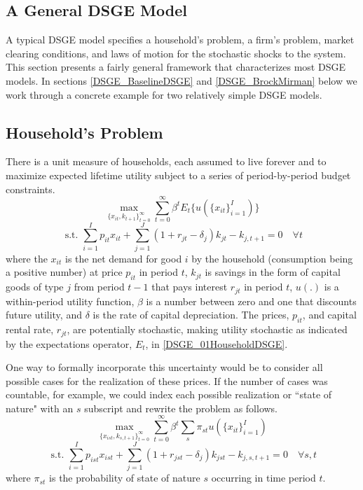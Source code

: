 \documentclass[letterpaper,12pt]{article}
\theoremstyle{definition}
\begin{document}
\begin{spacing}{1.5}
\section{A General DSGE Model}
	A typical DSGE model specifies a household's problem, a firm's problem, market clearing conditions, and laws of motion for the stochastic shocks to the system. This section presents a fairly general framework that characterizes most DSGE models. In sections \ref{DSGE_BaselineDSGE} and \ref{DSGE_BrockMirman} below we work through a concrete example for two relatively simple DSGE models.

	\subsection{Household's Problem}
		There is a unit measure of households, each assumed to live forever and to maximize expected lifetime utility subject to a series of period-by-period budget constraints.
		\begin{equation}\label{DSGE_01HouseholdDSGE}
		 \max_{\{x_{it},k_{t+1}\}_{t=0}^\infty} \sum_{t=0}^\infty \beta^t E_t\{u(\{x_{it}\}_{i=1}^I)\} \nonumber
		\end{equation}
		\begin{equation}
		\text{ s.t. } \sum_{i=1}^I p_{it}x_{it} + \sum_{j=1}^J(1+r_{jt}-\delta_{j})k_{jt} - k_{j,t+1} = 0\quad \forall t
		\end{equation}
		where the $x_{it}$ is the net demand for good $i$ by the household (consumption being a positive number) at price $p_{it}$ in period $t$, $k_{jt}$ is savings in the form of capital goods of type $j$ from period $t-1$ that pays interest $r_{jt}$ in period $t$, $u(.)$ is a within-period utility function, $\beta$ is a number between zero and one that discounts future utility, and $\delta$ is the rate of capital depreciation. The prices, $p_{it}$, and capital rental rate, $r_{jt}$, are potentially stochastic, making utility stochastic as indicated by the expectations operator, $E_t$, in \eqref{DSGE_01HouseholdDSGE}.

		One way to formally incorporate this uncertainty would be to consider all possible cases for the realization of these prices. If the number of cases was countable, for example, we could index each possible realization or ``state of nature" with an $s$ subscript and rewrite the problem as follows.
		\begin{equation}\label{DSGE_02HouseholdDSGE}
		 \max_{\{x_{ist},k_{s,t+1}\}_{t=0}^\infty} \sum_{t=0}^\infty \beta^t \sum_s \pi_{st}u(\{x_{it}\}_{i=1}^I) \nonumber
		\end{equation}
		\begin{equation}
		\text{ s.t. } \sum_{i=1}^I p_{ist}x_{ist} + \sum_{j=1}^J (1+r_{jst}-\delta_j)k_{jst} - k_{j,s,t+1} = 0 \quad \forall s,t
		\end{equation}
		where $\pi_{st}$ is the probability of state of nature $s$ occurring in time period $t$.


\end{spacing}
\end{document}
